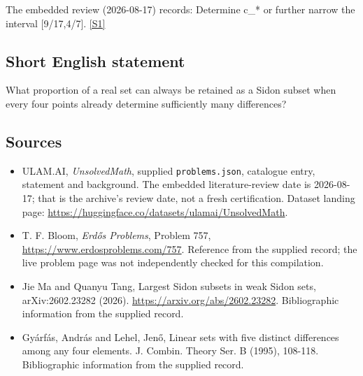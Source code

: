 \documentclass[11pt,a4paper]{article}
\newcommand{\sref}[2]{\hyperlink{source:#1:#2}{[S#2]}}
\begin{document}
The embedded review (2026-08-17) records: Determine c\_* or further narrow the interval [9/17,4/7]. \sref{statement}{1}

\subsection{Short English statement}

What proportion of a real set can always be retained as a Sidon subset when every four points already determine sufficiently many differences?

\subsection{Sources}

{\small

\begin{itemize}

\item[\hypertarget{source:statement:1}{S1}] ULAM.AI, \emph{UnsolvedMath}, supplied \texttt{problems.json}, catalogue entry, statement and background. The embedded literature-review date is 2026-08-17; that is the archive’s review date, not a fresh certification. Dataset landing page: \url{https://huggingface.co/datasets/ulamai/UnsolvedMath}.

\item[\hypertarget{source:statement:2}{S2}] T. F. Bloom, \emph{Erdős Problems}, Problem 757, \url{https://www.erdosproblems.com/757}. Reference from the supplied record; the live problem page was not independently checked for this compilation.

\item[\hypertarget{source:statement:3}{S3}] Jie Ma and Quanyu Tang, Largest Sidon subsets in weak Sidon sets, arXiv:2602.23282 (2026). \url{https://arxiv.org/abs/2602.23282}. Bibliographic information from the supplied record.

\item[\hypertarget{source:statement:4}{S4}] Gy\'{a}rf\'{a}s, Andr\'{a}s and Lehel, Jen\H{o}, Linear sets with five distinct differences among any four elements. J. Combin. Theory Ser. B (1995), 108-118. Bibliographic information from the supplied record.

\end{itemize}

}

\label{end:statement}
\end{document}
